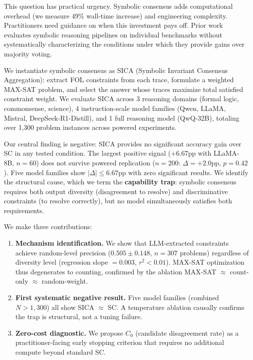 \documentclass[11pt,a4paper]{article}
\begin{document}
This question has practical urgency. Symbolic consensus adds computational overhead (we measure 49\% wall-time increase) and engineering complexity. Practitioners need guidance on when this investment pays off. Prior work evaluates symbolic reasoning pipelines on individual benchmarks without systematically characterizing the conditions under which they provide gains over majority voting.

We instantiate symbolic consensus as SICA (Symbolic Invariant Consensus Aggregation): extract FOL constraints from each trace, formulate a weighted MAX-SAT problem, and select the answer whose traces maximize total satisfied constraint weight. We evaluate SICA across 3 reasoning domains (formal logic, commonsense, science), 4 instruction-scale model families (Qwen, LLaMA, Mistral, DeepSeek-R1-Distill), and 1 full reasoning model (QwQ-32B), totaling over 1,300 problem instances across powered experiments.

Our central finding is negative: SICA provides no significant accuracy gain over SC in any tested condition. The largest positive signal ($+6.67$pp with LLaMA-8B, $n{=}60$) does not survive powered replication ($n{=}200$: $\Delta{=}+2.0$pp, $p{=}0.42$). Five model families show $|\Delta|{\leq}6.67$pp with zero significant results. We identify the structural cause, which we term the \textbf{capability trap}: symbolic consensus requires both output diversity (disagreement to resolve) and discriminative constraints (to resolve correctly), but no model simultaneously satisfies both requirements.

We make three contributions:
\begin{enumerate}
\item \textbf{Mechanism identification.} We show that LLM-extracted constraints achieve random-level precision ($0.505 \pm 0.148$, $n{=}307$ problems) regardless of diversity level (regression slope $= 0.003$, $r^2 < 0.01$). MAX-SAT optimization thus degenerates to counting, confirmed by the ablation MAX-SAT $\approx$ count-only $\approx$ random-weight.
\item \textbf{First systematic negative result.} Five model families (combined $N{>}1{,}300$) all show SICA $\approx$ SC. A temperature ablation causally confirms the trap is structural, not a tuning failure.
\item \textbf{Zero-cost diagnostic.} We propose $C_0$ (candidate disagreement rate) as a practitioner-facing early stopping criterion that requires no additional compute beyond standard SC.
\end{enumerate}
\end{document}

